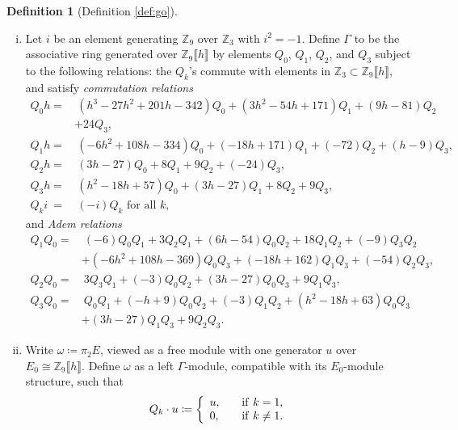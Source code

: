 \documentclass{gtpart}
\theoremstyle{definition}
\newtheorem{defn}[thm]{Definition}
\theoremstyle{remark}
\newcommand{\mb}[1]{\mathbb{#1}}
\newcommand{\BZ}{{\mb Z}}
\newcommand{\G}{\Gamma}
\newcommand{\ce}{\coloneqq}
\numberwithin{equation}{section}
\numberwithin{thm}{section}
\begin{document}
\begin{defn}[Definition \ref{def:go}]
\label{def}
 \mbox{}
 \begin{enumerate}[(i)]
  \item \label{gamma} Let $i$ be an element generating $\BZ_9$ over 
  $\BZ_3$ with $i^2 = -1$.  Define $\G$ to be the associative ring 
  generated over $\BZ_9 \llbracket h \rrbracket$ by elements $Q_0$, 
  $Q_1$, $Q_2$, and $Q_3$ subject to the following relations: the 
  $Q_k$'s commute with elements in 
  $\BZ_3 \subset \BZ_9 \llbracket h \rrbracket$, and satisfy 
  {\em commutation relations} 
  \begin{equation*}
  \begin{split}
   Q_0 h = & ~ (h^3 - 27 h^2 + 201 h - 342) Q_0 + (3 h^2 - 54 h + 171) Q_1 + (9 h - 81) Q_2 \\
           & + 24 Q_3, \\
   Q_1 h = & ~ (-6 h^2 + 108 h - 334) Q_0 + (-18 h + 171) Q_1 + (-72) Q_2 + (h - 9) Q_3, \\
   Q_2 h = & ~ (3 h - 27) Q_0 + 8 Q_1 + 9 Q_2 + (-24) Q_3, \\
   Q_3 h = & ~ (h^2 - 18 h + 57) Q_0 + (3 h - 27) Q_1 + 8 Q_2 + 9 Q_3, \\
   Q_k i ~ = & ~ (-i) Q_k \text{~for all~} k, 
  \end{split}
  \end{equation*}
  and {\em Adem relations} 
  \begin{equation*}
  \begin{split}
   Q_1Q_0 = & ~ (-6) Q_0Q_1 + 3 Q_2Q_1 + (6 h - 54) Q_0Q_2 + 18 Q_1Q_2 + (-9) Q_3Q_2 \\
            & + (-6 h^2 + 108 h - 369) Q_0Q_3 + (-18 h + 162) Q_1Q_3 + (-54) Q_2Q_3, ~ \\
   Q_2Q_0 = & ~ 3 Q_3Q_1 + (-3) Q_0Q_2 + (3 h - 27) Q_0Q_3 + 9 Q_1Q_3, \\
   Q_3Q_0 = & ~ Q_0Q_1 + (-h + 9) Q_0Q_2 + (-3) Q_1Q_2 + (h^2 - 18 h + 63) Q_0Q_3 \\
            & + (3 h - 27) Q_1Q_3 + 9 Q_2Q_3.  
  \end{split}
  \end{equation*}

  \item \label{omega} Write $\omega \ce \pi_2 E$, viewed as a free 
  module with one generator $u$ over 
  $E_0 \cong \BZ_9 \llbracket h \rrbracket$.  Define $\omega$ as a left 
  $\G$-module, compatible with its $E_0$-module structure, such that 
  \[
   Q_k \cdot u \ce \left\{
   \begin{array}{ll}
     u,  & \quad {\rm if}~k = 1, \\
     0,  & \quad {\rm if}~k \neq 1.  
   \end{array}
   \right.
  \]
 \end{enumerate}
\end{defn}
\end{document}
